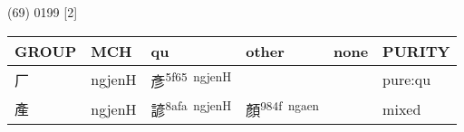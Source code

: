 \documentclass[14pt,a4paper]{scrartcl}
\begin{document}
(69) 0199 {[}2{]}

\begin{longtable}[c]{@{}llllll@{}}
\toprule
\begin{minipage}[b]{0.14\columnwidth}\raggedright\strut
GROUP
\strut\end{minipage} &
\begin{minipage}[b]{0.14\columnwidth}\raggedright\strut
MCH
\strut\end{minipage} &
\begin{minipage}[b]{0.14\columnwidth}\raggedright\strut
qu
\strut\end{minipage} &
\begin{minipage}[b]{0.14\columnwidth}\raggedright\strut
other
\strut\end{minipage} &
\begin{minipage}[b]{0.14\columnwidth}\raggedright\strut
none
\strut\end{minipage} &
\begin{minipage}[b]{0.14\columnwidth}\raggedright\strut
PURITY
\strut\end{minipage}\tabularnewline
\midrule
\endhead
\begin{minipage}[t]{0.14\columnwidth}\raggedright\strut
厂
\strut\end{minipage} &
\begin{minipage}[t]{0.14\columnwidth}\raggedright\strut
ngjenH
\strut\end{minipage} &
\begin{minipage}[t]{0.14\columnwidth}\raggedright\strut
彥\textsuperscript{5f65~ngjenH}
\strut\end{minipage} &
\begin{minipage}[t]{0.14\columnwidth}\raggedright\strut
\strut\end{minipage} &
\begin{minipage}[t]{0.14\columnwidth}\raggedright\strut
\strut\end{minipage} &
\begin{minipage}[t]{0.14\columnwidth}\raggedright\strut
pure:qu
\strut\end{minipage}\tabularnewline
\begin{minipage}[t]{0.14\columnwidth}\raggedright\strut
產
\strut\end{minipage} &
\begin{minipage}[t]{0.14\columnwidth}\raggedright\strut
ngjenH
\strut\end{minipage} &
\begin{minipage}[t]{0.14\columnwidth}\raggedright\strut
諺\textsuperscript{8afa~ngjenH}
\strut\end{minipage} &
\begin{minipage}[t]{0.14\columnwidth}\raggedright\strut
顏\textsuperscript{984f~ngaen}
\strut\end{minipage} &
\begin{minipage}[t]{0.14\columnwidth}\raggedright\strut
\strut\end{minipage} &
\begin{minipage}[t]{0.14\columnwidth}\raggedright\strut
mixed
\strut\end{minipage}\tabularnewline
\bottomrule
\end{longtable}
\end{document}
